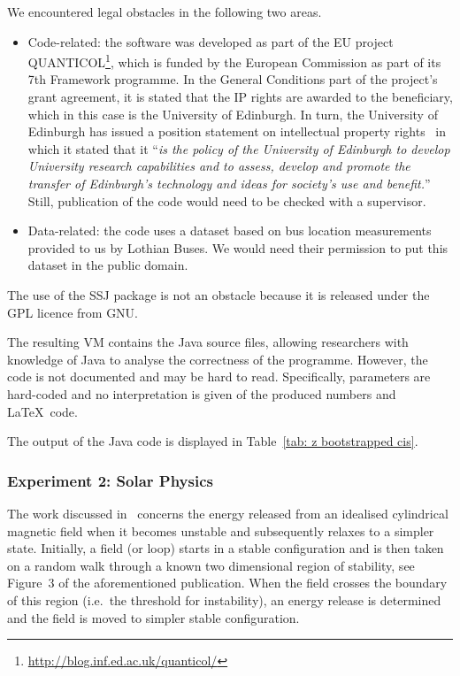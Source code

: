 We encountered legal obstacles in the following two areas.
\begin{itemize} 
\item Code-related: the software was developed as part of the EU project
QUANTICOL\footnote{\url{http://blog.inf.ed.ac.uk/quanticol/}}, which is funded by the European Commission as part of its 7th
Framework programme. In the General Conditions part of the project's grant
agreement, it is stated that the IP rights are awarded to the beneficiary, which
in this case is the University of Edinburgh. In turn, the University of
Edinburgh has issued a position statement on intellectual property
rights~\cite{edinburgh:ipr}
in which it stated that it ``\emph{is the policy of the University of Edinburgh to develop University research capabilities and to assess, develop and promote the transfer of Edinburgh's technology and ideas for society's use and benefit.}'' Still, publication of the code would need to be checked with a supervisor.
\item Data-related: the code uses a dataset based on bus location measurements provided to us by Lothian Buses. We would need their permission to put this dataset in the public domain.
\end{itemize}
The use of the SSJ package is not an obstacle because it is released under the GPL licence from GNU.

The resulting VM contains the Java source files, allowing
researchers with knowledge of Java to analyse the correctness of the programme.
However, the code is not documented and may be hard to read. Specifically,
parameters are hard-coded and no interpretation is given of the produced
numbers and \LaTeX\ code.

The output of the Java code is displayed in Table~\ref{tab: z bootstrapped cis}.



\subsubsection*{Experiment 2: Solar Physics}


The work discussed in~\cite{bareford2010nanoflare} concerns the energy released
from an idealised cylindrical magnetic field when it becomes unstable and
subsequently relaxes to a simpler state. Initially, a field (or loop) starts in
a stable configuration and is then taken on a random walk through a known two
dimensional region of stability, see \mbox{Figure 3} of the aforementioned
publication. When the field crosses the boundary of this region (i.e.\ the threshold for instability), an energy release is determined and the field is moved to simpler stable configuration. 

